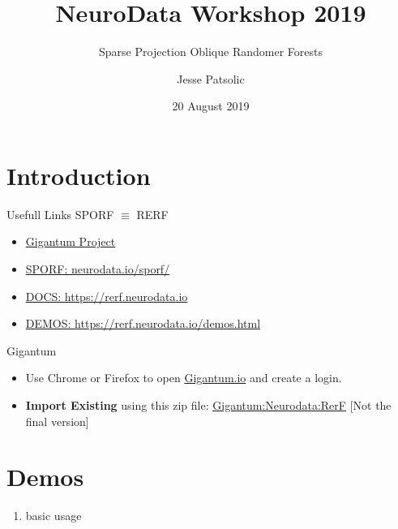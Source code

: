\documentclass[xcolor=dvipsnames]{beamer}
\title[NDWS-2019]{NeuroData Workshop 2019}
\subtitle[SPORF]{Sparse Projection Oblique Randomer Forests}
\author[JLP]{Jesse Patsolic}
\institute[JHU]{Johns Hopkins University}%
\date[20190820]{20 August 2019}
\begin{document}
\begin{frame}
\titlepage
\end{frame}



\section{Introduction}

\begin{frame}{Usefull Links}
    SPORF $\equiv$ RERF
    \begin{itemize}
        \item \href{https://gigantum.com/neurodata/rerf}{Gigantum Project}
        \item \href{https://neurodata.io/sporf/}{SPORF: neurodata.io/sporf/}
        \item \href{https://rerf.neurodata.io}{DOCS: https://rerf.neurodata.io}
        \item \href{https://rerf.neurodata.io/demos.html}{DEMOS: https://rerf.neurodata.io/demos.html}
    \end{itemize}
\end{frame}

\begin{frame}{Gigantum}
    \begin{itemize}
        \item Use Chrome or Firefox to open \href{https://rerf.gigantumdemo.com}{Gigantum.io} and create a login.
        \item \textbf{Import Existing} using this zip file:
            \href{http://cis.jhu.edu/~jesse/gigantum/rerf-9f82cd.zip}{Gigantum:Neurodata:RerF}
            [Not the final version]
    \end{itemize}
\end{frame}


\section{Demos}

\begin{frame}{}
    \begin{enumerate}
        \item basic usage
            
    \end{enumerate}
\end{frame}
\end{document}
